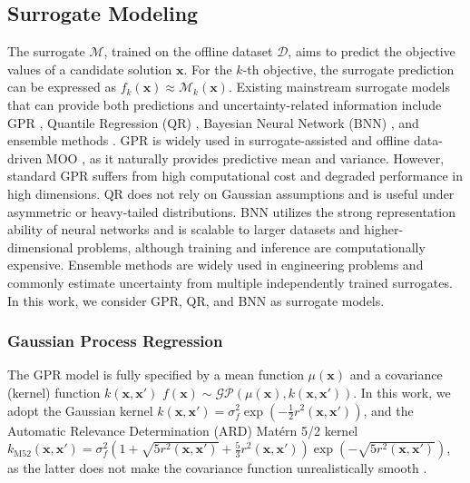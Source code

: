 \documentclass{article}
\begin{document}
\subsection{Surrogate Modeling}
The surrogate $\mathcal{M}$, trained on the offline dataset $\mathcal{D}$, aims to predict the objective values of a candidate solution $\boldsymbol{x}$. For the $k$-th objective, the surrogate prediction can be expressed as $f_{k}(\boldsymbol{x}) \approx \mathcal{M}_{k} (\boldsymbol{x})$. Existing mainstream surrogate models that can provide both predictions and uncertainty-related information include GPR \cite{gpr}, Quantile Regression (QR) \cite{quantile_regression}, Bayesian Neural Network (BNN) \cite{bnn}, and ensemble methods \cite{ddeo_2}. GPR is widely used in surrogate-assisted and offline data-driven MOO \cite{jin_gpr}, as it naturally provides predictive mean and variance. However, standard GPR suffers from high computational cost and degraded performance in high dimensions. QR does not rely on Gaussian assumptions and is useful under asymmetric or heavy-tailed distributions. BNN utilizes the strong representation ability of neural networks and is scalable to larger datasets and higher-dimensional problems, although training and inference are computationally expensive. Ensemble methods are widely used in engineering problems and commonly estimate uncertainty from multiple independently trained surrogates. In this work, we consider GPR, QR, and BNN as surrogate models.

\subsubsection{Gaussian Process Regression}
The GPR model is fully specified by a mean function $\mu(\mathbf{x})$ and a covariance (kernel) function $k(\mathbf{x}, \mathbf{x}')$
$f(\mathbf{x}) \sim \mathcal{GP}(\mu(\mathbf{x}), k(\mathbf{x}, \mathbf{x}'))$. In this work, we adopt the Gaussian kernel \cite{gaussian_kernel} 
$k(\mathbf{x}, \mathbf{x}')
=\sigma_f^2
\exp\!\left(-\tfrac{1}{2} r^2(\mathbf{x}, \mathbf{x}')\right)$,
and the Automatic Relevance Determination (ARD) Mat\'ern 5/2 kernel \cite{kernel_Matern_52}
$k_{\mathrm{M52}}(\mathbf{x}, \mathbf{x}')
=\sigma_f^2
\left(1 + \sqrt{5r^2(\mathbf{x}, \mathbf{x}')}
+ \tfrac{5}{3} r^2(\mathbf{x}, \mathbf{x}')\right)
\exp\!\left(-\sqrt{5r^2(\mathbf{x}, \mathbf{x}')}\right)$,
as the latter does not make the covariance function unrealistically smooth \cite{ddeo-TGPR}.
\end{document}

